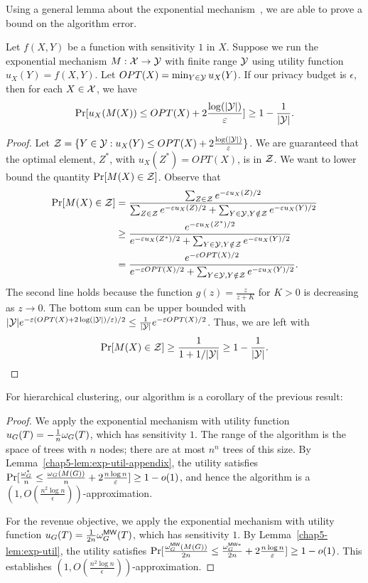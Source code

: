 Using a general lemma about the exponential mechanism~\citep{mcsherry2007mechanism}, we are able to prove a bound on the algorithm error.
\begin{lem}\label{chap5-lem:exp-util-appendix}
Let $f(X,Y)$ be a function with sensitivity $1$ in $X$.
Suppose we run the exponential mechanism $M : \mathcal{X} \rightarrow \mathcal{Y}$ with finite range $\mathcal{Y}$ using utility function $u_X(Y) = f(X,Y)$. Let $OPT(X) = \min_{Y \in \mathcal{Y}} u_X(Y)$. If our privacy budget is $\epsilon$, then for each $X \in \mathcal{X}$, we have
\[
    \Pr[u_X(M(X)) \leq OPT(X) + 2\frac{\log(|\mathcal{Y}|)}{\varepsilon}] \geq 1-\frac{1}{|\mathcal{Y}|}.
\]
\end{lem}
\begin{proof}
    Let $\mathcal{Z} = \{Y \in \mathcal{Y} : u_X(Y) \leq OPT(X) + 2\frac{\log(|\mathcal{Y}|)}{\varepsilon}\}$. We are guaranteed that the optimal element, $Z^*$, with $u_X(Z^*) = OPT(X)$, is in $\mathcal{Z}$. We want to lower bound the quantity $\Pr[M(X) \in \mathcal{Z}]$. Observe that
    \begin{align*}
        \Pr[M(X) \in \mathcal{Z}] &= \frac{\sum_{Z \in \mathcal{Z}} e^{-\varepsilon u_X(Z)/2}}{\sum_{Z \in \mathcal{Z}} e^{-\varepsilon u_X(Z)/2} + \sum_{Y \in \mathcal{Y}, Y \notin \mathcal{Z}} e^{-\varepsilon u_X(Y)/2}} \\
        &\geq \frac{e^{-\varepsilon u_X(Z^*)/2}}{e^{-\varepsilon u_X(Z^*)/2} + \sum_{Y \in \mathcal{Y}, Y \notin \mathcal{Z}} e^{-\varepsilon u_X(Y)/2}} \\
        &= \frac{e^{-\varepsilon OPT(X)/2}}{e^{-\varepsilon OPT(X)/2} + \sum_{Y \in \mathcal{Y}, Y \notin \mathcal{Z}} e^{-\varepsilon u_X(Y)/2}}.
    \end{align*}
    The second line holds because the function $g(z) = \frac{z}{z+K}$ for $K > 0$ is decreasing as $z \rightarrow 0$. The bottom sum can be upper bounded with $|\mathcal{Y}| e^{-\varepsilon (OPT(X) + 2\log(|\mathcal{Y}|) / \varepsilon)/2} \leq \frac{1}{|\mathcal{Y}|} e^{-\varepsilon OPT(X)/2}$. Thus, we are left with
    \[
        \Pr[M(X) \in \mathcal{Z}] \geq \frac{1}{1 + 1 / |\mathcal{Y}|} \geq 1-\frac{1}{|\mathcal{Y}|}.
    \]
\end{proof}
For hierarchical clustering, our algorithm is a corollary of the previous result:

\begin{proof}
We apply the exponential mechanism with utility function $u_G(T) = -\frac{1}{n} \omega_G(T)$, which has sensitivity $1$. The range of the algorithm is the space of trees with $n$ nodes; there are at most $n^n$ trees of this size. By Lemma~\ref{chap5-lem:exp-util-appendix}, the utility satisfies $\Pr[ \frac{\omega_G^*}{n} \leq \frac{\omega_G(M(G))}{n} + 2 \frac{n \log n}{\varepsilon}] \geq 1-o(1)$, and hence the algorithm is a $(1, O(\frac{n^2 \log n}{\epsilon}))$-approximation. 

For the revenue objective, we apply the exponential mechanism with utility function $u_G(T) = \frac{1}{2n} \omega_G^{\textsf{MW}}(T)$, which has sensitivity $1$. By Lemma~\ref{chap5-lem:exp-util}, the utility satisfies $\Pr[\frac{\omega_G^{\textsf{MW}}(M(G))}{2n} \leq \frac{\omega_G^{\textsf{MW}*}}{2n} + 2 \frac{n \log n}{\varepsilon}] \geq 1-o(1)$. This establishes $(1, O(\frac{n^2\log n}{\epsilon}))$-approximation.
\end{proof}



